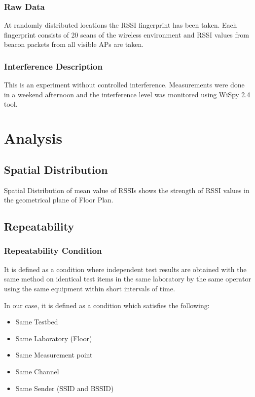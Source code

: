 \documentclass[11pt,a4paper,headinclude,footinclude,chapterprefix=on]{scrreprt}
\begin{document}
\subsection{Raw Data}
At randomly distributed locations the RSSI fingerprint has been taken. Each fingerprint consists of 20 scans of the wireless environment and RSSI values from beacon packets from all visible APs are taken.

\subsection{Interference Description}
This is an experiment without controlled interference. Measurements were done in a weekend afternoon and the interference level was monitored using WiSpy 2.4 tool.


\chapter{Analysis}
\section{Spatial Distribution}
Spatial Distribution of mean value of RSSIs shows the strength of RSSI values in the geometrical plane of Floor Plan.

\section{Repeatability}
\subsection{Repeatability Condition}
It is defined as a condition where independent test results are obtained with the same method on identical test items in the same laboratory by the same operator using the same equipment within short intervals of time.

In our case, it is defined as a condition which satisfies the following:
\begin{itemize}
\item Same Testbed
\item Same Laboratory (Floor)
\item Same Measurement point
\item Same Channel
\item Same Sender (SSID and BSSID)
\end{itemize}
\end{document}
